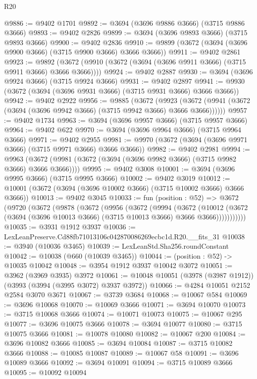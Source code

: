 \begin{lexlean}{R20}
\begin{coremodule}
@9886 := @9402 @1701
@9892 := @3694 (@3696 @9886 @3666) (@3715 @9886 @3666)
@9893 := @9402 @2826
@9899 := @3694 (@3696 @9893 @3666) (@3715 @9893 @3666)
@9900 := @9402 @2836
@9910 := @9899 (@3672 (@3694 (@3696 @9900 @3666) (@3715 @9900 @3666) @3666 @3666))
@9911 := @9402 @2861
@9923 := @9892 (@3672 (@9910 (@3672 (@3694 (@3696 @9911 @3666) (@3715 @9911 @3666) @3666 @3666))))
@9924 := @9402 @2887
@9930 := @3694 (@3696 @9924 @3666) (@3715 @9924 @3666)
@9931 := @9402 @2897
@9941 := @9930 (@3672 (@3694 (@3696 @9931 @3666) (@3715 @9931 @3666) @3666 @3666))
@9942 := @9402 @2922
@9956 := @9885
    (@3672
      (@9923 (@3672 (@9941 (@3672 (@3694 (@3696 @9942 @3666) (@3715 @9942 @3666) @3666 @3666))))))
@9957 := @9402 @1734
@9963 := @3694 (@3696 @9957 @3666) (@3715 @9957 @3666)
@9964 := @9402 @622
@9970 := @3694 (@3696 @9964 @3666) (@3715 @9964 @3666)
@9971 := @9402 @2955
@9981 := @9970 (@3672 (@3694 (@3696 @9971 @3666) (@3715 @9971 @3666) @3666 @3666))
@9982 := @9402 @2981
@9994 := @9963 (@3672 (@9981 (@3672 (@3694 (@3696 @9982 @3666) (@3715 @9982 @3666) @3666 @3666))))
@9995 := @9402 @3008
@10001 := @3694 (@3696 @9995 @3666) (@3715 @9995 @3666)
@10002 := @9402 @3019
@10012 := @10001 (@3672 (@3694 (@3696 @10002 @3666) (@3715 @10002 @3666) @3666 @3666))
@10013 := @9402 @3045
@10033 := fun (position : @52) =>
  @3672
    (@9720
      (@3672
        (@9878
          (@3672
            (@9956
              (@3672
                (@9994
                  (@3672
                    (@10012
                      (@3672 (@3694 (@3696 @10013 @3666) (@3715 @10013 @3666) @3666 @3666)))))))))))
@10035 := @3931 @1912 @3937
@10036 := LexLeanPreserve.Cd88fb71013106c042870086269ecbc1d.R20.__fits_31
@10038 := @3940 (@10036 @3465)
@10039 := LexLeanStd.Sha256.roundConstant
@10042 := @10038 (@660 (@10039 @3465))
@10044 := (position : @52) -> @10035 @10042
@10048 := @3954 @1912 @3937 @10042 @3072
@10051 := @3962 (@3969 @3935) @3972
@10061 := @10048 @10051 (@3978 (@3987 @1912)) (@3993 (@3994 (@3995 @3072) @3937 @3972))
@10066 := @4284 @10051 @2152 @2584 @3070 @3671
@10067 := @3739 @3684
@10068 := @10067 @584
@10069 := @3696 @10068
@10070 := @10069 @3666
@10071 := @3694 @10070
@10073 := @3715 @10068 @3666
@10074 := @10071 @10073
@10075 := @10067 @295
@10077 := @3696 @10075 @3666
@10078 := @3694 @10077
@10080 := @3715 @10075 @3666
@10081 := @10078 @10080
@10082 := @10067 @200
@10084 := @3696 @10082 @3666
@10085 := @3694 @10084
@10087 := @3715 @10082 @3666
@10088 := @10085 @10087
@10089 := @10067 @58
@10091 := @3696 @10089 @3666
@10092 := @3694 @10091
@10094 := @3715 @10089 @3666
@10095 := @10092 @10094

\end{coremodule}
\end{lexlean}
